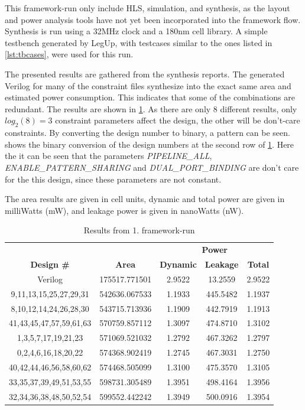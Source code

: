 This framework-run only include HLS, simulation, and synthesis, as the layout and power analysis tools have not yet been incorporated into the framework flow. Synthesis is run using a 32MHz clock and a 180nm cell library. A simple testbench generated by LegUp, with testcases similar to the ones listed in \cref{lst:tbcases}, were used for this run. 

The presented results are gathered from the synthesis reports. The generated Verilog for many of the constraint files synthesize into the exact same area and estimated power consumption. This indicates that some of the combinations are redundant. The results are shown in \cref{tab:hlsrun1dataresults}. As there are only 8 different results, only $log_2(8) = 3$ constraint parameters affect the design, the other will be don't-care constraints. By converting the design number to binary, a pattern can be seen.  shows the binary conversion of the design numbers at the second row of \cref{tab:hlsrun1dataresults}. Here the it can be seen that the parameters \textit{PIPELINE\_ALL}, \textit{ENABLE\_PATTERN\_SHARING} and \textit{DUAL\_PORT\_BINDING} are don't care for the this design, since these parameters are not constant.

The area results are given in cell units, dynamic and total power are given in milliWatts (mW), and leakage power is given in nanoWatts (nW).


\begin{table}[hbtp]
    \centering
    \begin{tabular}{ccccc}
    & & \multicolumn{3}{c}{\textbf{Power}} \\
    \cline{3-5}
    \textbf{Design \#} & \textbf{Area} & \textbf{Dynamic} & \textbf{Leakage} & \textbf{Total} \\
    \toprule
    Verilog & 175517.771501 & 2.9522 & 13.2559 & 2.9522 \\
    9,11,13,15,25,27,29,31 & 542636.067533 & 1.1933 & 445.5482 & 1.1937 \\
    8,10,12,14,24,26,28,30 & 543715.713936 & 1.1909 & 442.7919 & 1.1913 \\
    41,43,45,47,57,59,61,63 & 570759.857112 & 1.3097 & 474.8710 & 1.3102 \\
    1,3,5,7,17,19,21,23 & 571069.521032 & 1.2792 & 467.3262 & 1.2797 \\
    0,2,4,6,16,18,20,22 & 574368.902419 & 1.2745 & 467.3031 & 1.2750 \\
    40,42,44,46,56,58,60,62 & 574468.505099 & 1.3100 & 475.3570 & 1.3105 \\
    33,35,37,39,49,51,53,55 & 598731.305489 & 1.3951 & 498.4164 & 1.3956 \\
    32,34,36,38,48,50,52,54 & 599552.442242 & 1.3949 & 500.0916 & 1.3954 \\
    \bottomrule
    \end{tabular}
    \caption{Results from 1. framework-run}
    \label{tab:hlsrun1dataresults}
\end{table}

